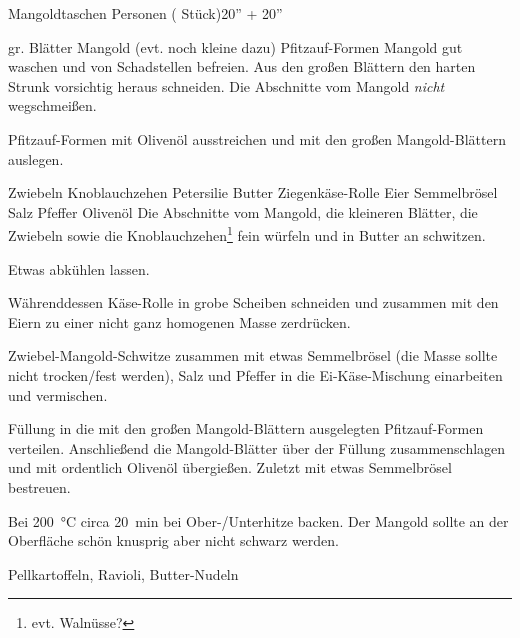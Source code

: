 \begin{MyRecipe}{Mangoldtaschen}{ Personen ( Stück)}{20'' + 20''}
	
	\ingredient[\Calc{6}{\x}]{} {gr. Blätter Mangold (evt. noch kleine dazu)}
	\ingredient[\Calc{6}{\x}]{} {Pfitzauf-Formen}
	Mangold gut waschen und von Schadstellen befreien. Aus den großen Blättern den harten Strunk vorsichtig heraus schneiden. Die Abschnitte vom Mangold \emph{nicht} wegschmeißen.
	
	Pfitzauf-Formen mit Olivenöl ausstreichen und mit den großen Mangold-Blättern auslegen.\par\bigskip
	
	\ingredient[\Calc{1}{\x}]{} {Zwiebeln}
	\ingredient[\Calc{2}{\x}]{} {Knoblauchzehen}
	 {Petersilie}
	 {Butter}
	 {Ziegenkäse-Rolle}
	\ingredient[\Calc{1}{\x}]{} {Eier}
	\ingredient[\Calc{1}{\x}]{} {Semmelbrösel}
	 {Salz}
	 {Pfeffer}
	 {Olivenöl}
	Die Abschnitte vom Mangold, die kleineren Blätter, die Zwiebeln sowie die Knoblauchzehen\footnote{evt. Walnüsse?} fein würfeln und in Butter an schwitzen.

	Etwas abkühlen lassen.
	
	Währenddessen Käse-Rolle in grobe Scheiben schneiden und zusammen mit den Eiern zu einer nicht ganz homogenen Masse zerdrücken.
	
	Zwiebel-Mangold-Schwitze zusammen mit etwas Semmelbrösel (die Masse sollte nicht trocken/fest werden), Salz und Pfeffer in die Ei-Käse-Mischung einarbeiten und vermischen.

	Füllung in die mit den großen Mangold-Blättern ausgelegten Pfitzauf-Formen verteilen. Anschließend die Mangold-Blätter über der Füllung zusammenschlagen und mit ordentlich Olivenöl übergießen. Zuletzt mit etwas Semmelbrösel bestreuen.
	\par\bigskip

	Bei \SI{200}{\degreeCelsius} circa \SI{20}{\minute} bei Ober-/Unterhitze backen. Der Mangold sollte an der Oberfläche schön knusprig aber nicht schwarz werden.
	\par\bigskip

	Pellkartoffeln, Ravioli, Butter-Nudeln
	

	
	
\end{MyRecipe}